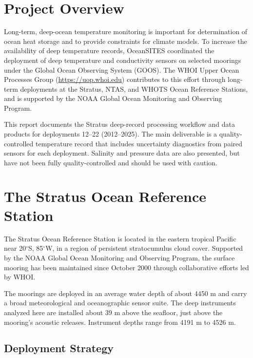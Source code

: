 
\section{Project Overview}

Long-term, deep-ocean temperature monitoring is important for determination of ocean heat storage and to provide constraints for climate models. To increase the availability of deep temperature records, OceanSITES coordinated the deployment of deep temperature and conductivity sensors on selected moorings under the Global Ocean Observing System (GOOS). The WHOI Upper Ocean Processes Group (\url{https://uop.whoi.edu}) contributes to this effort through long-term deployments at the Stratus, NTAS, and WHOTS Ocean Reference Stations, and is supported by the NOAA Global Ocean Monitoring and Observing Program.

This report documents the Stratus deep-record processing workflow and data products for deployments 12--22 (2012--2025). The main deliverable is a quality-controlled temperature record that includes uncertainty diagnostics from paired sensors for each deployment. Salinity and pressure data are also presented, but have not been fully quality-controlled and should be used with caution.

\section{The Stratus Ocean Reference Station}

The Stratus Ocean Reference Station is located in the eastern tropical Pacific near 20$^{\circ}$S, 85$^{\circ}$W, in a region of persistent stratocumulus cloud cover. Supported by the NOAA Global Ocean Monitoring and Observing Program, the surface mooring has been maintained since October 2000 through collaborative efforts led by WHOI.

The moorings are deployed in an average water depth of about 4450 m and carry a broad meteorological and oceanographic sensor suite. The deep instruments analyzed here are installed about 39 m above the seafloor, just above the mooring's acoustic releases. Instrument depths range from 4191 m to 4526 m.

\subsection{Deployment Strategy}

